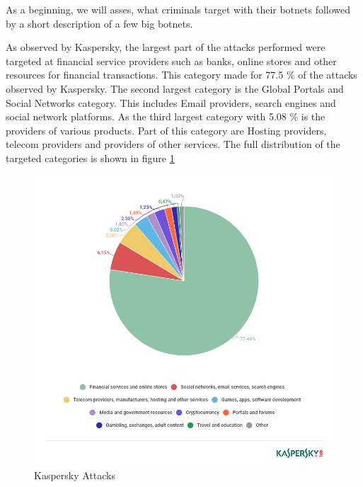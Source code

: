 As a beginning, we will asses, what criminals target with their botnets followed by a short description of a few big botnets.

 As observed by Kaspersky, the largest part of the attacks performed were targeted at financial service providers such as banks, online stores and other resources for financial transactions. This category made for 77.5 \% of the attacks observed by Kaspersky. The second largest category is the Global Portals and Social Networks category. This includes Email providers, search engines and social network platforms.\cite{Eremin19}
As the third largest category with 5.08 \% is the providers of various products. Part of this category are Hosting providers, telecom providers and providers of other services. 
The full distribution of the targeted categories is shown in figure \ref{fig:KasperskyAttacks}

\begin{figure}[ht]
\begin{center} \includegraphics[scale=0.5]{Talk11/kasperskyAttacks} \end{center}
\caption{Kaspersky Attacks}
\label{fig:KasperskyAttacks}
\end{figure}

